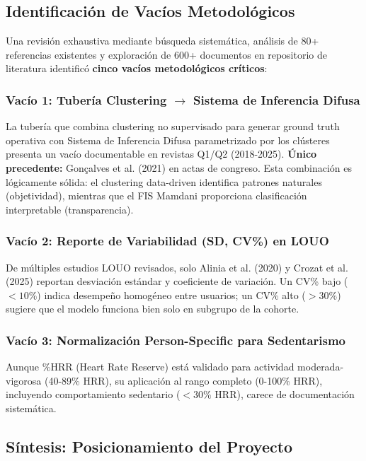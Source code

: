 \subsection{Identificación de Vacíos Metodológicos}
\label{subsec:identificacion_vacios}

Una revisión exhaustiva mediante búsqueda sistemática, análisis de 80+ referencias existentes y exploración de 600+ documentos en repositorio de literatura identificó \textbf{cinco vacíos metodológicos críticos}:

\subsubsection{Vacío 1: Tubería Clustering $\rightarrow$ Sistema de Inferencia Difusa}

La tubería que combina clustering no supervisado para generar ground truth operativa con Sistema de Inferencia Difusa parametrizado por los clústeres presenta un vacío documentable en revistas Q1/Q2 (2018-2025). \textbf{Único precedente:} Gonçalves et al. (2021) en actas de congreso. Esta combinación es lógicamente sólida: el clustering data-driven identifica patrones naturales (objetividad), mientras que el FIS Mamdani proporciona clasificación interpretable (transparencia).

\subsubsection{Vacío 2: Reporte de Variabilidad (SD, CV\%) en LOUO}

De múltiples estudios LOUO revisados, solo Alinia et al. (2020) y Crozat et al. (2025) reportan desviación estándar y coeficiente de variación. Un CV\% bajo ($< 10\%$) indica desempeño homogéneo entre usuarios; un CV\% alto ($> 30\%$) sugiere que el modelo funciona bien solo en subgrupo de la cohorte.

\subsubsection{Vacío 3: Normalización Person-Specific para Sedentarismo}

Aunque \%HRR (Heart Rate Reserve) está validado para actividad moderada-vigorosa (40-89\% HRR), su aplicación al rango completo (0-100\% HRR), incluyendo comportamiento sedentario ($< 30\%$ HRR), carece de documentación sistemática.

\subsection{Síntesis: Posicionamiento del Proyecto}
\label{subsec:sintesis_posicionamiento}

